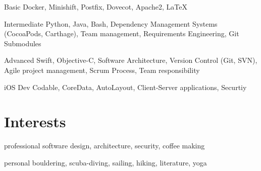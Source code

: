 \documentclass[]{friggeri-cv} %
\begin{document}
\begin{entrylist}

	
	\smallentry
	{Basic}
	{Docker, Minishift, Postfix, Dovecot, Apache2, LaTeX}
	
	
	\smallentry
	{Intermediate}
	{Python, Java, Bash, Dependency Management Systems (CocoaPods, Carthage), Team management, Requirements Engineering, Git Submodules}
	
	
	\smallentry
	{Advanced}
	{Swift, Objective-C, Software Architecture, Version Control (Git, SVN), Agile project management, Scrum Process, Team responsibility}
	
	
	\smallentry
	{iOS Dev}
	{Codable, CoreData, AutoLayout, Client-Server applications, Securtiy}


\end{entrylist}


\section{Interests}

\begin{entrylist}
	\smallentry
	{professional}
	{software design, architecture, security, coffee making}

	\smallentry
	{personal}
	{bouldering, scuba-diving, sailing, hiking, literature, yoga}
	
\end{entrylist}



\end{document}
